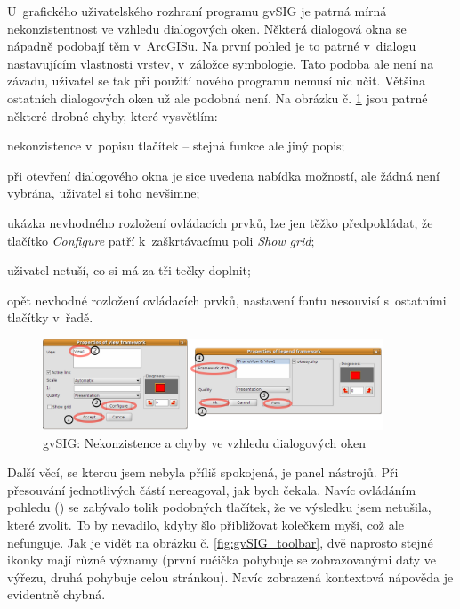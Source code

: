 \documentclass[a4paper,12pt,draft]{article}
\begin{document}
U~grafického uživatelského rozhraní programu gvSIG je patrná mírná
nekonzistentnost ve vzhledu dialogových oken. Některá dialogová okna se
nápadně podobají těm v~ArcGISu. Na první pohled je to patrné v~dialogu
nastavujícím vlastnosti vrstev, v~záložce symbologie. Tato podoba ale
není na závadu, uživatel se tak při použití nového programu nemusí
nic učit. Většina ostatních dialogových oken už ale podobná není. Na
obrázku č. \ref{fig:gvSIG_dialogy} jsou patrné některé drobné chyby,
které vysvětlím:
\begin{inparaenum}[\itshape 1\upshape)]
\item nekonzistence v~popisu tlačítek -- stejná funkce ale jiný popis;
\item při otevření dialogového okna je sice uvedena nabídka možností,
ale žádná není vybrána, uživatel si toho nevšimne;
\item ukázka nevhodného rozložení ovládacích prvků, lze jen těžko
předpokládat, že tlačítko \emph{Configure} patří k~zaškrtávacímu
poli \emph{Show grid};
\item uživatel netuší, co si má za tři tečky doplnit;
\item opět nevhodné rozložení ovládacích prvků, nastavení fontu
nesouvisí s~ostatními tlačítky v~řadě.
\end{inparaenum}

\begin{figure}[h!]
\centering
\includegraphics[width=0.9\textwidth]{./GUI_screenshots/gvSIG_dialogy.png}
\caption{gvSIG: Nekonzistence a chyby ve vzhledu dialogových oken}
\label{fig:gvSIG_dialogy}
\end{figure}

Další věcí, se kterou jsem nebyla příliš spokojená, je panel
nástrojů. Při pře\-souvání jednotlivých částí nereagoval, jak bych
čekala. Navíc ovládáním pohledu () se zabývalo tolik
podobných tlačítek, že ve výsledku jsem netušila, které zvolit. To by
nevadilo, kdyby šlo přibližovat kolečkem myši, což ale nefunguje. Jak je
vidět na obrázku č. \ref{fig:gvSIG_toolbar}, dvě naprosto stejné ikonky
mají různé významy (první ručička pohybuje se zobrazovanými daty ve
výřezu, druhá pohybuje celou stránkou). Navíc zobrazená kontextová
nápověda je evidentně chybná.
\end{document}
